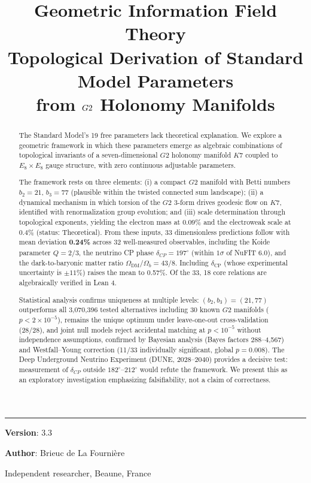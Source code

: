 \documentclass[11pt,a4paper]{article}
\title{%
\LARGE\textbf{Geometric Information Field Theory}\\[0.3em]
\Large Topological Derivation of Standard Model Parameters\\
from $\Gtwo$ Holonomy Manifolds\\
}
\author{}
\date{}
\newcommand{\E}{\mathrm{E}}
\newcommand{\Gtwo}{\mathrm{G}_2}
\newcommand{\Kseven}{K_7}
\newcommand{\CP}{\mathrm{CP}}
\newcommand{\theoretical}{\textsc{Theoretical}}
\def\CP{CP}%
\def\Gtwo{G2}%
\def\Kseven{K7}%
\def\E{E}%
\def\theoretical{Theoretical}%
\begin{document}
\maketitle
\noindent\rule{\textwidth}{0.2pt}

\noindent\textbf{Version}: 3.3

\noindent\textbf{Author}: Brieuc de La Fourni\`ere

\noindent Independent researcher, Beaune, France

\vfill

\begin{abstract}
The Standard Model's 19 free parameters lack theoretical explanation. We explore a geometric framework in which these parameters emerge as algebraic combinations of topological invariants of a seven-dimensional $\Gtwo$ holonomy manifold $\Kseven$ coupled to $\E_8 \times \E_8$ gauge structure, with zero continuous adjustable parameters.

The framework rests on three elements: (i) a compact $\Gtwo$ manifold with Betti numbers $b_2 = 21$, $b_3 = 77$ (plausible within the twisted connected sum landscape); (ii) a dynamical mechanism in which torsion of the $\Gtwo$ 3-form drives geodesic flow on $\Kseven$, identified with renormalization group evolution; and (iii) scale determination through topological exponents, yielding the electron mass at 0.09\% and the electroweak scale at 0.4\% (status: \theoretical{}). From these inputs, 33 dimensionless predictions follow with mean deviation \textbf{0.24\%} across 32 well-measured observables, including the Koide parameter $Q = 2/3$, the neutrino CP phase $\delta_{\CP} = 197^\circ$ (within $1\sigma$ of NuFIT 6.0), and the dark-to-baryonic matter ratio $\Omega_{\mathrm{DM}}/\Omega_b = 43/8$. Including $\delta_{\mathrm{CP}}$ (whose experimental uncertainty is $\pm 11\%$) raises the mean to 0.57\%. Of the 33, 18 core relations are algebraically verified in Lean 4.

Statistical analysis confirms uniqueness at multiple levels: $(b_2, b_3) = (21, 77)$ outperforms all 3,070,396 tested alternatives including 30 known $\Gtwo$ manifolds ($p < 2 \times 10^{-5}$), remains the unique optimum under leave-one-out cross-validation (28/28), and joint null models reject accidental matching at $p < 10^{-5}$ without independence assumptions, confirmed by Bayesian analysis (Bayes factors 288--4{,}567) and Westfall--Young correction (11/33 individually significant, global $p = 0.008$). The Deep Underground Neutrino Experiment (DUNE, 2028--2040) provides a decisive test: measurement of $\delta_{\CP}$ outside $182^\circ$--$212^\circ$ would refute the framework. We present this as an exploratory investigation emphasizing falsifiability, not a claim of correctness.
\end{abstract}
\end{document}
